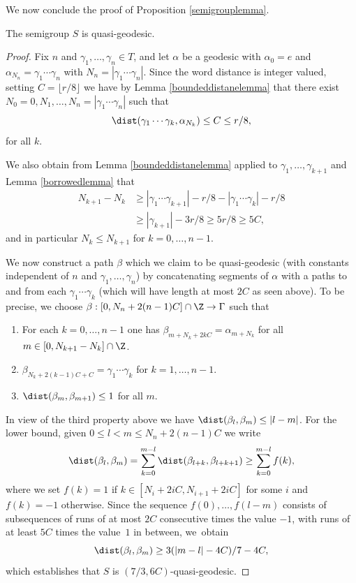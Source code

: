 We now conclude the proof of Proposition \ref{semigrouplemma}.

\begin{lemma}
The semigroup \(S\) is quasi-geodesic.
\end{lemma}
\begin{proof}
Fix \(n\) and \(\gamma_1,\ldots, \gamma_n \in T\), and let \(\alpha\) be a geodesic with \(\alpha_0 = e\) and \(\alpha_{N_n} = \gamma_1\cdots \gamma_n\) with \(N_n = |\gamma_1\cdots \gamma_n|\).
Since the word distance is integer valued, setting \(C = \lfloor r/8 \rfloor\) we have by Lemma \ref{boundeddistanelemma} that there exist \(N_0 = 0, N_1, \ldots,N_n = |\gamma_1\cdots \gamma_n|\) such that\vspace*{-3pt}
\[
\dist(\gamma_1\cdots \gamma_k, \alpha_{N_k}) \le C \le r/8,
\]
for all \(k\).

We also obtain from Lemma \ref{boundeddistanelemma} applied to \(\gamma_1,\ldots, \gamma_{k+1}\) and Lemma \ref{borrowedlemma} that
\begin{align*}
N_{k+1} - N_k &\ge |\gamma_1\cdots \gamma_{k+1}|-r/8 - |\gamma_1\cdots \gamma_k| -r/8
\\ &\ge |\gamma_{k+1}| - 3r/8 \ge 5r/8 \ge 5C,
\end{align*}
and in particular \(N_{k} \le N_{k+1}\) for \(k = 0,\ldots, n-1\).

We now construct a path \(\beta\) which we claim to be quasi-geodesic (with constants independent of \(n\) and \(\gamma_1,\ldots,\gamma_n\)) by concatenating segments of \(\alpha\) with a paths to and from each \(\gamma_1\cdots \gamma_k\) (which will have length at most \(2C\) as seen above).
To be precise, we choose \(\beta:[0,N_n + 2(n-1)C] \cap \Z \to \Gamma\) such that
\begin{enumerate}
\item For each \(k = 0,\ldots,n-1\) one has \(\beta_{m+N_k+2kC} = \alpha_{m+N_k}\) for all \(m \in [0,N_{k+1}-\nobreak N_k] \cap \Z\).
\item \(\beta_{N_k + 2(k-1)C + C} = \gamma_1\cdots \gamma_k\) for \(k = 1,\ldots, n-1\).
\item \(\dist(\beta_m, \beta_{m+1})\le 1\) for all \(m\).
\end{enumerate}
In view of the third property above we have
\(\dist(\beta_l,\beta_m) \le |l-m|\).
For the lower bound, given \(0 \le l < m \le N_n + 2(n-1)C\) we write
\[
\dist(\beta_l,\beta_m) = \sum_{k = 0}^{m-l}\dist(\beta_{l+k},\beta_{l+k+1}) \ge \sum_{k = 0}^{m-l}f(k),
\]
where we set \(f(k) = 1\) if \(k \in [N_i+2iC,N_{i+1}+2iC]\) for some \(i\) and \(f(k) = -1\) otherwise.
Since the sequence \(f(0),\ldots,f(l-m)\) consists of subsequences of runs of at most \(2C\) consecutive times the value \(-1\), with runs of at least \(5C\) times the value~\(1\) in between, we~obtain
\[
\dist(\beta_l,\beta_m) \ge 3(|m-l| - 4C)/7 - 4C,
\]
which establishes that \(S\) is \((7/3, 6C)\)-quasi-geodesic.
\end{proof}

